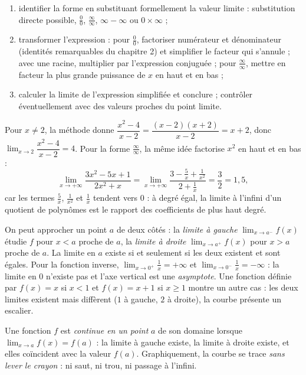 \begin{methode}
\begin{enumerate}
\item identifier la forme en substituant formellement la valeur limite : substitution directe possible, $\frac{0}{0}$, $\frac{\infty}{\infty}$, $\infty - \infty$ ou $0 \times \infty$ ;
\item transformer l'expression : pour $\frac{0}{0}$, factoriser numérateur et dénominateur (identités remarquables du chapitre 2) et simplifier le facteur qui s'annule ; avec une racine, multiplier par l'expression conjuguée ; pour $\frac{\infty}{\infty}$, mettre en facteur la plus grande puissance de $x$ en haut et en bas ;
\item calculer la limite de l'expression simplifiée et conclure ; contrôler éventuellement avec des valeurs proches du point limite.
\end{enumerate}
\end{methode}

Pour $x \neq 2$, la méthode donne $\dfrac{x^{2}-4}{x-2} = \dfrac{(x-2)(x+2)}{x-2} = x + 2$, donc $\lim_{x \to 2} \dfrac{x^{2}-4}{x-2} = 4$. Pour la forme $\frac{\infty}{\infty}$, la même idée factorise $x^{2}$ en haut et en bas :
\[
\lim_{x \to +\infty} \frac{3x^{2} - 5x + 1}{2x^{2} + x} = \lim_{x \to +\infty} \frac{3 - \frac{5}{x} + \frac{1}{x^{2}}}{2 + \frac{1}{x}} = \frac{3}{2} = 1{,}5,
\]
car les termes $\frac{5}{x}$, $\frac{1}{x^{2}}$ et $\frac{1}{x}$ tendent vers $0$ : à degré égal, la limite à l'infini d'un quotient de polynômes est le rapport des coefficients de plus haut degré.

On peut approcher un point $a$ de deux côtés : la \emph{limite à gauche} $\lim_{x \to a^{-}} f(x)$ étudie $f$ pour $x < a$ proche de $a$, la \emph{limite à droite} $\lim_{x \to a^{+}} f(x)$ pour $x > a$ proche de $a$. La limite en $a$ existe si et seulement si les deux existent et sont égales. Pour la fonction inverse, $\lim_{x \to 0^{+}} \frac{1}{x} = +\infty$ et $\lim_{x \to 0^{-}} \frac{1}{x} = -\infty$ : la limite en $0$ n'existe pas et l'axe vertical est une \emph{asymptote}. Une fonction définie par $f(x) = x$ si $x < 1$ et $f(x) = x + 1$ si $x \geq 1$ montre un autre cas : les deux limites existent mais diffèrent ($1$ à gauche, $2$ à droite), la courbe présente un escalier.

\begin{definition}
Une fonction $f$ est \emph{continue en un point} $a$ de son domaine lorsque $\lim_{x \to a} f(x) = f(a)$ : la limite à gauche existe, la limite à droite existe, et elles coïncident avec la valeur $f(a)$. Graphiquement, la courbe se trace \emph{sans lever le crayon} : ni saut, ni trou, ni passage à l'infini.
\end{definition}

